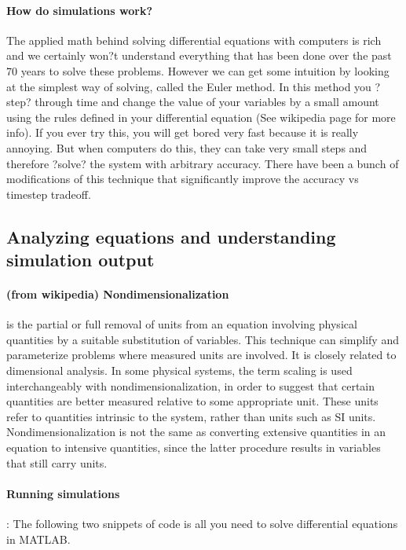 \paragraph{How do simulations work?} The applied math behind solving differential equations with computers is rich and we certainly won?t understand everything that has been done over the past 70 years to solve these problems.  However we can get some intuition by looking at the simplest way of solving, called the Euler method.  In this method you ?step? through time and change the value of your variables by a small amount using the rules defined in your differential equation (See wikipedia page for more info).  If you ever try this, you will get bored very fast because it is really annoying.  But when computers do this, they can take very small steps and therefore ?solve? the system with arbitrary accuracy.  There have been a bunch of modifications of this technique that significantly improve the accuracy vs timestep tradeoff.


% 



\subsection{Analyzing equations and understanding simulation output}

\paragraph{(from wikipedia) Nondimensionalization} is the partial or full removal of units from an equation involving physical quantities by a suitable substitution of variables. This technique can simplify and parameterize problems where measured units are involved. It is closely related to dimensional analysis. In some physical systems, the term scaling is used interchangeably with nondimensionalization, in order to suggest that certain quantities are better measured relative to some appropriate unit. These units refer to quantities intrinsic to the system, rather than units such as SI units. Nondimensionalization is not the same as converting extensive quantities in an equation to intensive quantities, since the latter procedure results in variables that still carry units.

\paragraph{Running simulations}: The following two snippets of code is all you need to solve differential equations in MATLAB.


